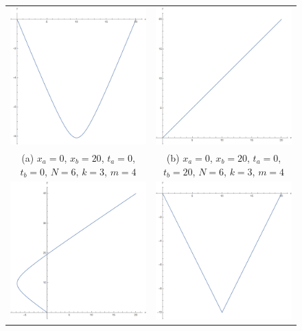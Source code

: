 \documentclass[12pt]{revtex4}
\begin{document}
\begin{figure}
	\begin{tabular} {cc}
		\includegraphics[width=0.4\linewidth]{schwinger1} &   \includegraphics[width=0.4\linewidth]{schwinger2} \\
		(a)  $x_a=0$, $x_b=20$, $t_a=0$, $t_b=0$, $N=6$, $k=3$, $m=4$ & (b) $x_a=0$, $x_b=20$, $t_a=0$, $t_b=20$, $N=6$, $k=3$, $m=4$  \\[6pt]
		\includegraphics[width=0.4\linewidth]{schwinger3} &   \includegraphics[width=0.4\linewidth]{schwinger4} \\

\end{tabular}
\end{figure}
\end{document}
